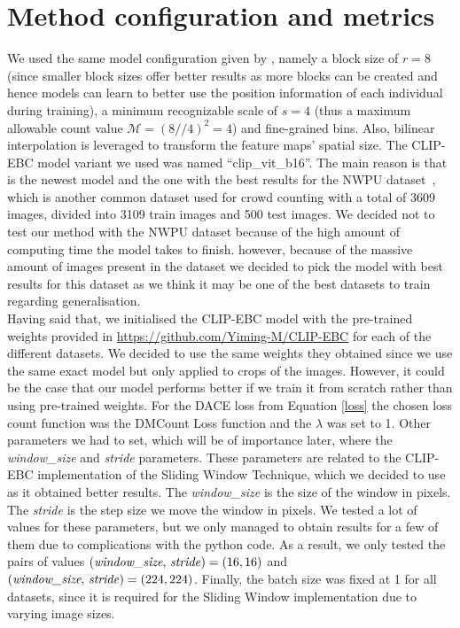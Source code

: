 \section{Method configuration and metrics}
We used the same model configuration given by \cite{CLIP}, namely a block size of $r=8$ (since smaller block sizes offer better results as more blocks can be created and hence models can learn to better use the position information of each individual during training), a minimum recognizable scale of $s=4$ (thus a maximum allowable count value $\mathcal{M}=(8//4)^2=4$) and fine-grained bins. Also, bilinear interpolation is leveraged to transform the feature
maps' spatial size. The CLIP-EBC model variant we used was named ``clip\_vit\_b16''. The main reason is that is the newest model and the one with the best results for the NWPU dataset~\citep{nwpu}, which is another common dataset used for crowd counting with a total of 3609 images, divided into 3109 train images and 500 test images. We decided not to test our method with the NWPU dataset because of the high amount of computing time the model takes to finish. however, because of the massive amount of images present in the dataset we decided to pick the model with best results for this dataset as we think it may be one of the best datasets to train regarding generalisation.\\

Having said that, we initialised the CLIP-EBC model with the pre-trained weights provided in \url{https://github.com/Yiming-M/CLIP-EBC} for each of the different datasets. We decided to use the same weights they obtained since we use the same exact model but only applied to crops of the images. However, it could be the case that our model performs better if we train it from scratch rather than using pre-trained weights. For the DACE loss from Equation \ref{loss} the chosen loss count function was the DMCount Loss function and the $\lambda$ was set to 1. Other parameters we had to set, which will be of importance later, where the \textit{window\_size} and \textit{stride} parameters. These parameters are related to the CLIP-EBC implementation of the Sliding Window Technique, which we decided to use as it obtained better results. The \textit{window\_size} is the size of the window in pixels. The \textit{stride} is the step size we move the window in pixels. We tested a lot of values for these parameters, but we only managed to obtain results for a few of them due to complications with the python code. As a result, we only tested the pairs of values $(\text{\textit{window\_size}, \textit{stride}})=(16,16)$ and $(\text{\textit{window\_size}, \textit{stride}})=(224,224)$. Finally, the batch size was fixed at 1 for all datasets, since it is required for the Sliding Window implementation due to varying image sizes.\\

